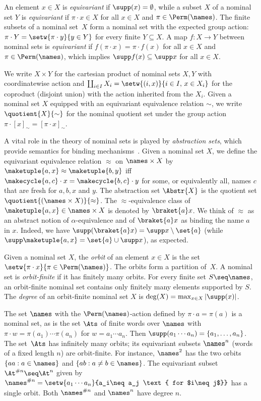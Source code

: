 \documentclass[10pt, final, conference, a4paper, twocolumn]{IEEEtran}
\begin{document}
An element $x \in X$ is \emph{equivariant} if $\supp(x) = \emptyset$, while a subset $X$ of a nominal set $Y$ is \emph{equivariant} if $\pi\cdot x\in X$ for all $x\in X$ and $\pi\in\Perm(\names)$.
The finite subsets of a nominal set~$X$ form a nominal set with the expected group action: $\pi \cdot Y = \setw{\pi \cdot y}{y \in Y}$ for every finite $Y \subseteq X$.
A map $f\colon X \to Y$ between nominal sets is \emph{equivariant} if $f(\pi \cdot x) = \pi \cdot f(x)$ for all $x \in X$
and $\pi \in \Perm(\names)$, which implies $\supp f(x) \subseteq \supp
x$ for all $x \in X$.

We write $X\times Y$ for the cartesian product of nominal sets $X,Y$ with coordinatewise action and $\coprod_{i\in I} X_i = \setw{(i,x)}{i\in I,\, x\in X_i}$ for the coproduct (disjoint union) with the action inherited from the $X_i$.
Given a nominal set $X$ equipped with an equivariant equivalence relation $\sim$, we write $\quotient{X}{\sim}$ for the nominal quotient set under the group action $\pi \cdot [x]_\sim = [\pi\cdot x]_\sim$.

A vital role in the theory of nominal sets is played by \emph{abstraction sets}, which provide semantics for binding mechanisms~\cite{gp99}.
Given a nominal set $X$, we define the equivariant equivalence relation $\approx$ on $\names \times X$ by $\maketuple{a,x} \approx \maketuple{b,y}$ iff $\makecycle{a,c} \cdot x=\makecycle{b,c} \cdot y$ for some, or equivalently all, names $c$ that are fresh for $a, b, x$ and $y$.
The abstraction set $\Abstr{X}$ is the quotient set $\quotient{(\names\times X)}{\approx}$. The $\approx$-equivalence
class of $\maketuple{a,x} \in \names \times X$ is denoted by $\braket{a}x$.
We think of $\approx$ as an abstract notion of $\alpha$-equivalence and of $\braket{a}x$ as binding the name $a$ in $x$.
Indeed, we have $\supp(\braket{a}x) = \supp x \setminus \set{a}$ (while $\supp\maketuple{a,x} =
\set{a} \cup \supp x$), as expected. %

Given a nominal set $X$, the \emph{orbit} of an element $x\in X$ is the set  $\setw{\pi\cdot x}{\pi \in \Perm(\names)}$.
The orbits form a partition of~$X$.
A nominal set is \emph{orbit-finite} if it has finitely many orbits. For every finite set $S\seq\names$, an orbit-finite nominal set contains only finitely many elements supported by $S$. The \emph{degree} of an orbit-finite nominal set $X$ is  $\deg(X) = \max_{x\in X} |\supp(x)|$. 

\begin{example}
  The set $\names$ with the $\Perm(\names)$-action defined by $\pi\cdot a = \pi(a)$ is a nominal set, as is the set $\Ats$ of finite words over $\names$ with $\pi\cdot w=\pi(a_1)\cdots\pi(a_n)$ for $w=a_1\cdots a_n$.
  Then $\supp(a_1\cdots a_n)=\{a_1,\ldots,a_n\}$. The set~$\Ats$ has infinitely many orbits;
  its equivariant subsets $\names^n$ (words of a fixed length $n$) are orbit-finite.
  For instance, $\names^2$ has the two orbits $\{aa: a\in \names\}$ and $\{ab: a\neq b\in \names\}$.
    The equivariant subset $\At^{\#n}\seq \At^n$ given by $\names^{\#n} = \setw{a_1\cdots a_n}{a_i\neq a_j
    \text{ for $i\neq j$}}$ has a single orbit. Both $\names^{\# n}$ and $\names^n$ have degree $n$.
\end{example}
\end{document}
